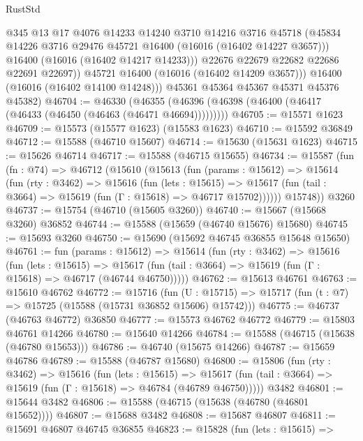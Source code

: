 \begin{lexlean}{RustStd}
\begin{coremodule}
                @345
                @13
                @17
                @4076
                @14233
                @14240
                @3710
                @14216
                @3716
                @45718
                (@45834 @14226 @3716 @29476 @45721 @16400 (@16016 (@16402 @14227 @3657)))
                @16400
                (@16016 (@16402 @14217 @14233)))
              @22676
              @22679
              @22682
              @22686
              @22691
              @22697))
          @45721
          @16400
          (@16016 (@16402 @14209 @3657)))
        @16400
        (@16016 (@16402 @14100 @14248)))
      @45361
      @45364
      @45367
      @45371
      @45376
      @45382)
@46704 := @46330
    (@46355 (@46396 (@46398 (@46400 (@46417 (@46433 (@46450 (@46463 (@46471 @46694)))))))))
@46705 := @15571 @1623
@46709 := @15573 (@15577 @1623) (@15583 @1623)
@46710 := @15592 @36849
@46712 := @15588 (@46710 @15607)
@46714 := @15630 (@15631 @1623)
@46715 := @15626 @46714
@46717 := @15588 (@46715 @15655)
@46734 := @15587
    (fun (fn : @74) =>
    @46712
      (@15610
        (@15613
          (fun (params : @15612) =>
          @15614
            (fun (rty : @3462) =>
            @15616
              (fun (lets : @15615) =>
              @15617 (fun (tail : @3664) => @15619 (fun (Γ : @15618) => @46717 @15702))))))
        @15748))
    @3260
@46737 := @15754 (@46710 (@15605 @3260))
@46740 := @15667 (@15668 @3260) @36852
@46744 := @15588 (@15659 (@46740 @15676) @15680)
@46745 := @15693 @3260
@46750 := @15690 (@15692 @46745 @36855 @15648 @15650)
@46761 := fun (params : @15612) =>
  @15614
    (fun (rty : @3462) =>
    @15616
      (fun (lets : @15615) =>
      @15617 (fun (tail : @3664) => @15619 (fun (Γ : @15618) => @46717 (@46744 @46750)))))
@46762 := @15613 @46761
@46763 := @15610 @46762
@46772 := @15716
    (fun (U : @15715) => @15717 (fun (t : @7) => @15725 (@15588 (@15731 @36852 @15606) @15742)))
@46775 := @46737 (@46763 @46772) @36850
@46777 := @15573 @46762 @46772
@46779 := @15803 @46761 @14266
@46780 := @15640 @14266
@46784 := @15588 (@46715 (@15638 (@46780 @15653)))
@46786 := @46740 (@15675 @14266)
@46787 := @15659 @46786
@46789 := @15588 (@46787 @15680)
@46800 := @15806
    (fun (rty : @3462) =>
    @15616
      (fun (lets : @15615) =>
      @15617 (fun (tail : @3664) => @15619 (fun (Γ : @15618) => @46784 (@46789 @46750)))))
    @3482
@46801 := @15644 @3482
@46806 := @15588 (@46715 (@15638 (@46780 (@46801 @15652))))
@46807 := @15688 @3482
@46808 := @15687 @46807
@46811 := @15691 @46807 @46745 @36855
@46823 := @15828
    (fun (lets : @15615) =>

\end{coremodule}
\end{lexlean}
